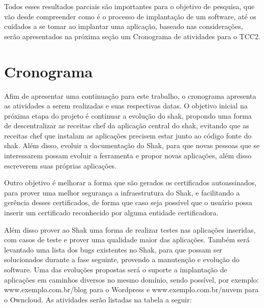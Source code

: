 Todos esses resultados parciais são importantes para o objetivo de pesquisa, que vão
desde compreender como é o processo de implantação de um software, até os cuidados
a se tomar ao implantar uma aplicação, baseado nas considerações, serão apresentados
na próxima seção um Cronograma de atividades para o TCC2.


\section{Cronograma}
%

Afim de apresentar uma continuação para este trabalho, o cronograma apresenta as
atividades a serem realizadas e suas respectivas datas.
O objetivo inicial na próxima etapa do projeto é continuar a evolução do shak,
propondo uma forma de descentralizar as receitas chef da aplicação central do shak,
evitando que as receitas chef que instalam as aplicações precisem estar junto ao
código fonte do shak. Além disso, evoluir a documentação do Shak, para que novas
pessoas que se interessarem possam evoluir a ferramenta e propor novas aplicações,
além disso escreverem suas próprias aplicações.

Outro objetivo é melhorar a forma que são gerados os certificados autoassinados,
para prover uma melhor segurança a infraestrutura do Shak, e facilitando a gerência
desses certificados, de forma que caso seja possível que o usuário possa inserir um certificado
reconhecido por alguma entidade certificadora.

Além disso prover ao Shak uma forma de realizar testes nas aplicações inseridas,
com casos de teste e prover uma qualidade maior das aplicações. Também será levantado
uma lista dos bugs existentes no Shak, para que possam ser solucionados durante
a fase seguinte, provendo a manutenção e evolução do software. Uma das evoluções
propostas será o suporte a implantação de aplicações em caminhos diversos no mesmo
domínio, sendo possível, por exemplo: www.exemplo.com.br/blog para o Wordpress e
www.exemplo.com.br/nuvem para o Owncloud. As atividades serão listadas na tabela
a seguir:

